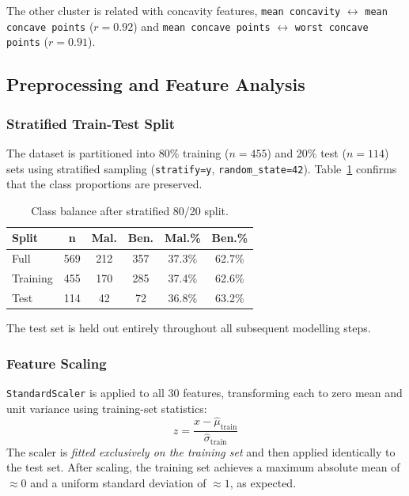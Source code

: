 \documentclass[twocolumn, fontsize=10pt]{article}
\begin{document}
The other cluster is related with concavity features, \texttt{mean concavity} $\leftrightarrow$ \texttt{mean concave points} ($r = 0.92$) and \texttt{mean concave points} $\leftrightarrow$ \texttt{worst concave points} ($r = 0.91$).



\subsection{Preprocessing and Feature Analysis}

\subsubsection{Stratified Train-Test Split}

The dataset is partitioned into 80\% training ($n = 455$) and 20\% test ($n = 114$) sets using stratified sampling (\texttt{stratify=y}, \texttt{random\_state=42}). Table~\ref{tab:split_balance} confirms that the class proportions are preserved.

\begin{table}[H]
\centering
\small
\setlength{\tabcolsep}{4pt}
\begin{tabular}{lccccc}
\toprule
\textbf{Split} & \textbf{n} & \textbf{Mal.} & \textbf{Ben.} & \textbf{Mal.\%} & \textbf{Ben.\%} \\
\midrule
Full       & 569 & 212 & 357 & 37.3\% & 62.7\% \\
Training   & 455 & 170 & 285 & 37.4\% & 62.6\% \\
Test       & 114 &  42 &  72 & 36.8\% & 63.2\% \\
\bottomrule
\end{tabular}
\caption{Class balance after stratified 80/20 split.}
\label{tab:split_balance}
\end{table}

The test set is held out entirely throughout all subsequent modelling steps.

\subsubsection{Feature Scaling}

\texttt{StandardScaler} is applied to all 30 features, transforming each to zero mean and unit variance using training-set statistics:
\[
    z = \frac{x - \hat{\mu}_{\text{train}}}{\hat{\sigma}_{\text{train}}}
\]
The scaler is \textit{fitted exclusively on the training set} and then applied identically to the test set. After scaling, the training set achieves a maximum absolute mean of $\approx 0$ and a uniform standard deviation of $\approx 1$, as expected.\\
\end{document}

